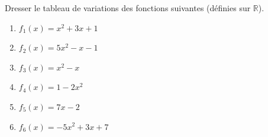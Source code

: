 \documentclass[a4paper,12pt]{article}
\begin{document}
\begin{exercice}[title=Exercice 19 \quad$\star$\quad\  {[Calculer]}]{}{}
Dresser le tableau de variations des fonctions suivantes (définies sur \( \mathbb{R} \)).
\begin{enumerate}
    \item \( f_1(x) = x^2 + 3x + 1 \)
    \item \( f_2(x) = 5x^2 - x - 1 \)
    \item \( f_3(x) = x^2 - x \)
    \item \( f_4(x) = 1 - 2x^2 \)
    \item \( f_5(x) = 7x - 2 \)
    \item \( f_6(x) = -5x^2 + 3x + 7 \)
\end{enumerate}
\end{exercice}
\end{document}

